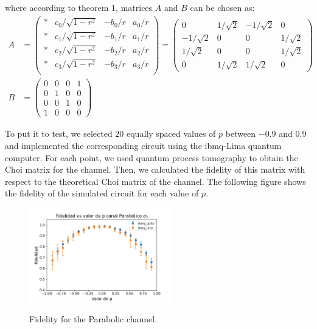 where according to theorem 1, matrices $A$ and $B$ can be chosen as:
\begin{eqnarray}
A &= \begin{pmatrix}
*  & c_0 / \sqrt{1-r^2} & -b_0/r & a_0 /r \\
*  & c_1 / \sqrt{1-r^2} & -b_1/r & a_1 /r \\ 
* & c_2 / \sqrt{1-r^2} & -b_2/r & a_2/r \\
* & c_3 / \sqrt{1-r^2} & -b_3/r & a_3/r \\
\end{pmatrix} = \begin{pmatrix}
0 & 1/\sqrt{2} & -1/\sqrt{2} & 0 \\
-1/\sqrt{2} & 0 & 0 & 1/\sqrt{2} \\
1/\sqrt{2} & 0 & 0 & 1/\sqrt{2} \\
0 & 1/\sqrt{2} & 1/\sqrt{2} & 0
\end{pmatrix} \\
B& = \begin{pmatrix}
0 & 0 & 0 & 1 \\
0 & 1 & 0 & 0\\
0 & 0& 1 & 0 \\
1 & 0 & 0 & 0 
\end{pmatrix}
\end{eqnarray}


To put it to test, we selected $20$ equally spaced values of $p$ between $-0.9$  and $0.9$ and implemented the corresponding circuit using the ibmq-Lima quantum computer. For each point, we used quantum process tomography to obtain the Choi matrix for the channel. Then, we calculated the fidelity of this matrix with respect to the theoretical Choi matrix of the channel. The following figure shows the fidelity of the simulated circuit for each value of $p$.
\begin{figure}[h!]
\centering
\includegraphics[width=0.55\textwidth]{fidelity-parabolic.PNG} \\
\caption{Fidelity for the Parabolic channel.}
\end{figure}


